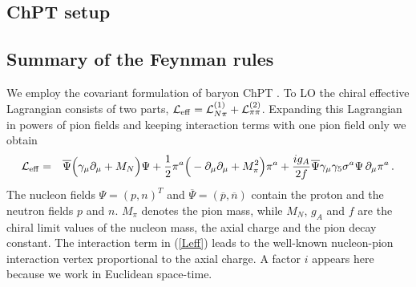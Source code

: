 \documentclass[11pt,prd,aps,showpacs,eqsecnum,floatfix,nofootinbib,preprint,tightenlines]{revtex4}
\newcommand{\pref}[1]{(\ref{#1})}
\begin{document}
\begin{appendix}
\section{ChPT setup}

\subsection{Summary of the Feynman rules}\label{appFeynmanRules}

We employ the covariant formulation of baryon ChPT \cite{Gasser:1987rb,Becher:1999he}.
To LO the chiral effective Lagrangian consists of two parts, ${\cal L}_{\rm eff}={\cal L}_{N\pi}^{(1)} + {\cal L}_{\pi\pi}^{(2)}$. Expanding this Lagrangian in powers of pion fields and keeping interaction terms with one pion field only we obtain
\begin{eqnarray}
\label{Leff}
{\cal L}_{\rm eff} &=& \overline{\Psi} \Big(\gamma_{\mu}\partial_{\mu} +M_N \Big)\Psi +\frac{1}{2}\pi^a \Big(- \partial_{\mu}\partial_{\mu} + M_{\pi}^2 \Big)\pi^a + \frac{ig_A}{2f}\overline{\Psi}\gamma_{\mu}\gamma_5\sigma^a \Psi \, \partial_{\mu} \pi^a\,.
\end{eqnarray}
The  nucleon fields $\Psi=(p,n)^T$ and $\overline{\Psi}=(\overline{p},\overline{n})$ 
contain the proton and the neutron fields $p$ and $n$.  $M_{\pi}$ denotes the pion mass, while $M_N$, $g_A$ and $f$ are the chiral limit values of the nucleon mass, the axial charge and the pion decay constant. The interaction term in \pref{Leff} leads to the well-known nucleon-pion interaction vertex proportional to the axial charge. A factor $i$ appears here because we work in Euclidean space-time. 


\end{appendix}
\end{document}
